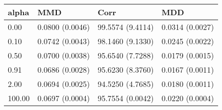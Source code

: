\begin{tabular}{llll}
\toprule
alpha & MMD & Corr & MDD \\
\midrule
0.00 & 0.0800 (0.0046) & 99.5574 (9.4114) & 0.0314 (0.0027) \\
0.10 & 0.0742 (0.0043) & 98.1460 (9.1330) & 0.0245 (0.0022) \\
0.50 & 0.0700 (0.0038) & 95.6540 (7.7288) & 0.0179 (0.0015) \\
0.91 & 0.0686 (0.0028) & 95.6230 (8.3760) & 0.0167 (0.0011) \\
2.00 & 0.0694 (0.0025) & 94.5250 (4.7685) & 0.0180 (0.0011) \\
100.00 & 0.0697 (0.0004) & 95.7554 (0.0042) & 0.0220 (0.0004) \\
\bottomrule
\end{tabular}
